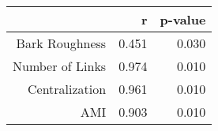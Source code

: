 \begin{table}[ht]
\centering
\begin{tabular}{rrr}
  \hline
 & r & p-value \\ 
  \hline
Bark Roughness & 0.451 & 0.030 \\ 
  Number of Links & 0.974 & 0.010 \\ 
  Centralization & 0.961 & 0.010 \\ 
  AMI & 0.903 & 0.010 \\ 
   \hline
\end{tabular}
\end{table}
